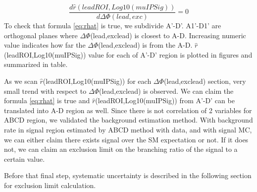 \begin{equation}
\label{eq:rhat}
	\frac{d\hat{r}(leadROI,Log10(muIPSig))}{d\Delta\Phi(lead,exc)}=0
\end{equation}
To check that formula \ref{eq:rhat} is true, we subdivide A'-D'.
A1'-D1' are orthogonal planes where $\Delta\Phi$(lead,exclead) is closest to A-D.
Increasing numeric value indicates how far the $\Delta\Phi$(lead,exclead) is from the A-D.
$\hat{r}$(leadROI,Log10(muIPSig)) value for each of A'-D' region is plotted in figures and summarized in table.



As we scan $\hat{r}$(leadROI,Log10(muIPSig)) for each $\Delta\Phi$(lead,exclead) section, very small trend with respect to $\Delta\Phi$(lead,exclead) is observed.
We can claim the formula \ref{eq:rhat} is true and $\hat{r}$(leadROI,Log10(muIPSig)) from A'-D' can be translated into A-D region as well.
Since there is not correlation of 2 variables for ABCD region, we validated the background estimation method.
With background rate in signal region estimated by ABCD method with data, and with signal MC, we can either claim there exists signal over the SM expectation or not.
If it does not, we can claim an exclusion limit on the branching ratio of the signal to a certain value.

Before that final step, systematic uncertainty is described in the following section for exclusion limit calculation.



